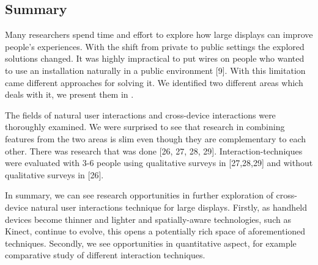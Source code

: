 \subsection{Summary}
Many researchers spend time and effort to explore how large displays can improve people's experiences. 
With the shift from private to public settings the explored solutions changed. 
It was highly impractical to put wires on people who wanted to use an installation naturally in a public environment [9].
With this limitation came different approaches for solving it. 
We identified two different areas which deals with it, we present them in .

\begin{figure*}
\centering
{}
\caption{}
\label{fig:litreview}
\end{figure*}
 
The fields of natural user interactions and cross-device interactions were thoroughly examined. 
We were surprised to see that research in combining features from the two areas is slim even though they are complementary to each other. 
There was research that was done [26, 27, 28, 29]. 
Interaction-techniques were evaluated with 3-6 people using qualitative surveys in [27,28,29] and without qualitative surveys in [26].

In summary, we can see research opportunities in further exploration of cross-device natural user interactions technique for large displays. 
Firstly, as handheld devices become thinner and lighter and spatially-aware technologies, such as Kinect, continue to evolve, this opens a potentially rich space of aforementioned techniques. 
Secondly, we see opportunities in quantitative aspect, for example comparative study of different interaction techniques. 
